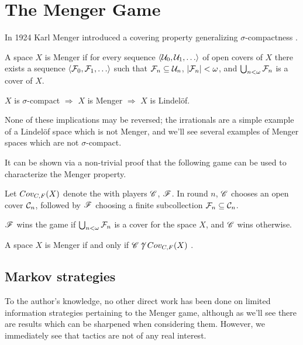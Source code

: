 
\chapter{The Menger Game}

In 1924 Karl Menger introduced a covering property generalizing
$\sigma$-compactness \cite{custom31879423}.

\begin{defn}
  A space $X$ is Menger if for every sequence $\<\mc U_0,\mc U_1,\dots\>$
  of open covers of $X$ there exists a sequence
  $\<\mc F_0,\mc F_1,\dots\>$ such that $\mathcal{F}_n\subseteq \mathcal{U}_n$,
  $|\mathcal{F}_n|<\omega$, and $\bigcup_{n<\omega}\mathcal{F}_n$ is a cover of $X$.
\end{defn}

\begin{prop}
  $X$ is $\sigma$-compact
    $\Rightarrow$
  $X$ is Menger
    $\Rightarrow$
  $X$ is Lindel\"of.
\end{prop}

None of these implications may be reversed; the irrationals are a simple example
of a Lindel\"of space which is not Menger, and we'll see several examples of
Menger spaces which are not $\sigma$-compact.

It can be shown via a non-trivial
proof that the following game can be used to characterize the Menger property.

\begin{game}
  Let $Cov_{C,F}(X)$ denote the  with players $\mathscr{C}$, $\mathscr{F}$.
  In round $n$, $\mathscr{C}$ chooses an open cover $\mathcal{C}_n$, followed by $\mathscr{F}$
  choosing a finite subcollection $\mathcal{F}_n\subseteq \mathcal{C}_n$.

  $\mathscr{F}$ wins the game if $\bigcup_{n<\omega}\mathcal{F}_n$ is a cover for the space
  $X$, and $\mathscr{C}$ wins otherwise.
\end{game}

\begin{thm}
  A space $X$ is Menger if and only if $\mathscr{C}\not\uparrow Cov_{C,F}(X)$
  \cite{MR1544773}.
\end{thm}

\section{Markov strategies}

To the author's knowledge, no other direct work has been done on limited
information strategies pertaining to the Menger game, although as we'll see
there are results which can be sharpened when considering them.
However, we immediately see that tactics are not of any real interest.

